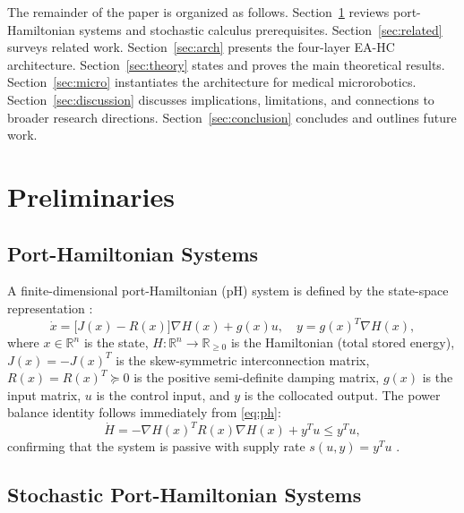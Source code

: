 \documentclass[11pt]{article}
\begin{document}
The remainder of the paper is organized as follows. Section~\ref{sec:prelim} reviews
port-Hamiltonian systems and stochastic calculus prerequisites. Section~\ref{sec:related}
surveys related work. Section~\ref{sec:arch} presents the four-layer EA-HC architecture.
Section~\ref{sec:theory} states and proves the main theoretical results.
Section~\ref{sec:micro} instantiates the architecture for medical microrobotics.
Section~\ref{sec:discussion} discusses implications, limitations, and connections to broader
research directions. Section~\ref{sec:conclusion} concludes and outlines future work.

\section{Preliminaries}
\label{sec:prelim}

\subsection{Port-Hamiltonian Systems}

A finite-dimensional port-Hamiltonian (pH) system is defined by the state-space representation
\cite{vanderschaft1995,maschke1992}:
\begin{equation}
\dot{x} = \bigl[J(x) - R(x)\bigr]\nabla H(x) + g(x)u, \quad
y = g(x)^T \nabla H(x),
\label{eq:ph}
\end{equation}
where $x\in\mathbb{R}^n$ is the state, $H:\mathbb{R}^n\to\mathbb{R}_{\ge 0}$ is the Hamiltonian
(total stored energy), $J(x)=-J(x)^T$ is the skew-symmetric interconnection matrix,
$R(x)=R(x)^T\succeq 0$ is the positive semi-definite damping matrix, $g(x)$ is the input
matrix, $u$ is the control input, and $y$ is the collocated output.
The power balance identity follows immediately from \eqref{eq:ph}:
\begin{equation}
\dot{H} = -\nabla H(x)^T R(x)\nabla H(x) + y^T u \le y^T u,
\label{eq:powerbal}
\end{equation}
confirming that the system is passive with supply rate $s(u,y)=y^T u$ \cite{vanderschaft2014}.

\subsection{Stochastic Port-Hamiltonian Systems}
\end{document}
